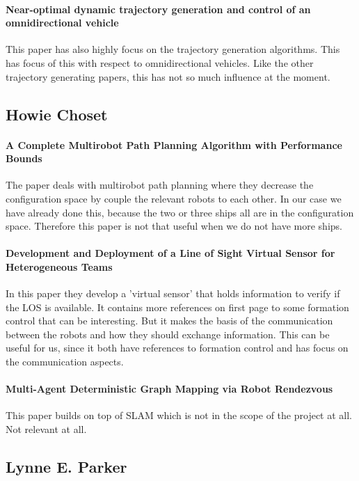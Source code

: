 \paragraph{Near-optimal dynamic trajectory generation and control of an omnidirectional vehicle}
This paper has also highly focus on the trajectory generation algorithms. This has focus of this with respect to omnidirectional vehicles.
Like the other trajectory generating papers, this has not so much influence at the moment.


\subsection{Howie Choset}

{\vskip0pt\color{gray}
\paragraph{A Complete Multirobot Path Planning Algorithm with Performance Bounds}
The paper deals with multirobot path planning where they decrease the configuration space by couple the relevant robots to each other. In our case we have already done this, because the two or three ships all are in the configuration space.
Therefore this paper is not that useful when we do not have more ships.}

\paragraph{Development and Deployment of a Line of Sight Virtual Sensor for Heterogeneous Teams }
In this paper they develop a 'virtual sensor' that holds information to verify if the LOS is available. It contains more references on first page to some formation control that can be interesting. But it makes the basis of the communication between the robots and how they should exchange information.
This can be useful for us, since it both have references to formation control and has focus on the communication aspects.

{\vskip0pt\color{gray}
\paragraph{Multi-Agent Deterministic Graph Mapping via Robot Rendezvous }
This paper builds on top of SLAM which is not in the scope of the project at all.
Not relevant at all.}


\subsection{Lynne E. Parker}

